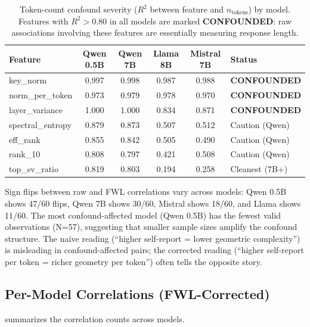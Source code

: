 \documentclass[11pt,a4paper]{article}
\begin{document}
\begin{table}[H]
\centering
\caption{Token-count confound severity ($R^2$ between feature and $n_{\text{tokens}}$) by model. Features with $R^2 > 0.80$ in all models are marked \textbf{CONFOUNDED}: raw associations involving these features are essentially measuring response length.}
\label{tab:confound_r2}
\begin{tabular}{lccccl}
\toprule
\textbf{Feature} & \textbf{Qwen 0.5B} & \textbf{Qwen 7B} & \textbf{Llama 8B} & \textbf{Mistral 7B} & \textbf{Status} \\
\midrule
key\_norm          & 0.997 & 0.998 & 0.987 & 0.988 & \textbf{CONFOUNDED} \\
norm\_per\_token   & 0.973 & 0.979 & 0.978 & 0.970 & \textbf{CONFOUNDED} \\
layer\_variance    & 1.000 & 1.000 & 0.834 & 0.871 & \textbf{CONFOUNDED} \\
spectral\_entropy  & 0.879 & 0.873 & 0.507 & 0.512 & Caution (Qwen) \\
eff\_rank          & 0.855 & 0.842 & 0.505 & 0.490 & Caution (Qwen) \\
rank\_10           & 0.808 & 0.797 & 0.421 & 0.508 & Caution (Qwen) \\
top\_sv\_ratio     & 0.819 & 0.803 & 0.194 & 0.258 & Cleanest (7B+) \\
\bottomrule
\end{tabular}
\end{table}

Sign flips between raw and FWL correlations vary across models: Qwen 0.5B shows 47/60 flips, Qwen 7B shows 30/60, Mistral shows 18/60, and Llama shows 11/60. The most confound-affected model (Qwen 0.5B) has the fewest valid observations (N=57), suggesting that smaller sample sizes amplify the confound structure. The naive reading (``higher self-report = lower geometric complexity'') is misleading in confound-affected pairs; the corrected reading (``higher self-report per token = richer geometry per token'') often tells the opposite story.

\subsection{Per-Model Correlations (FWL-Corrected)}

 summarizes the correlation counts across models.
\end{document}
